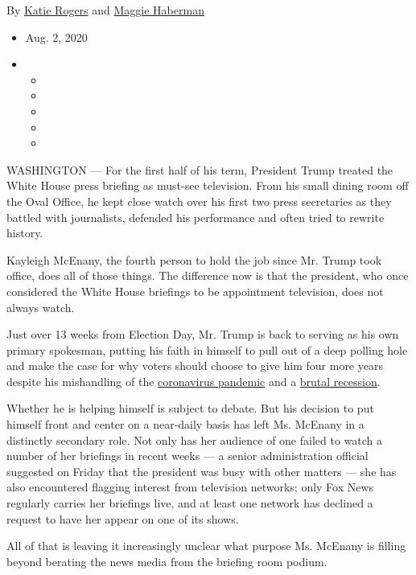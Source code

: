 By \href{https://www.nytimes.com/by/katie-rogers}{Katie Rogers} and
\href{https://www.nytimes.com/by/maggie-haberman}{Maggie Haberman}

\begin{itemize}
\item
  Aug. 2, 2020
\item
  \begin{itemize}
  \item
  \item
  \item
  \item
  \item
  \end{itemize}
\end{itemize}

WASHINGTON --- For the first half of his term, President Trump treated
the White House press briefing as must-see television. From his small
dining room off the Oval Office, he kept close watch over his first two
press secretaries as they battled with journalists, defended his
performance and often tried to rewrite history.

Kayleigh McEnany, the fourth person to hold the job since Mr. Trump took
office, does all of those things. The difference now is that the
president, who once considered the White House briefings to be
appointment television, does not always watch.

Just over 13 weeks from Election Day, Mr. Trump is back to serving as
his own primary spokesman, putting his faith in himself to pull out of a
deep polling hole and make the case for why voters should choose to give
him four more years despite his mishandling of the
\href{https://www.nytimes.com/news-event/coronavirus}{coronavirus
pandemic} and a
\href{https://www.nytimes.com/2020/07/30/business/economy/q2-gdp-coronavirus-economy.html}{brutal
recession}.

Whether he is helping himself is subject to debate. But his decision to
put himself front and center on a near-daily basis has left Ms. McEnany
in a distinctly secondary role. Not only has her audience of one failed
to watch a number of her briefings in recent weeks --- a senior
administration official suggested on Friday that the president was busy
with other matters --- she has also encountered flagging interest from
television networks; only Fox News regularly carries her briefings live,
and at least one network has declined a request to have her appear on
one of its shows.

All of that is leaving it increasingly unclear what purpose Ms. McEnany
is filling beyond berating the news media from the briefing room podium.

